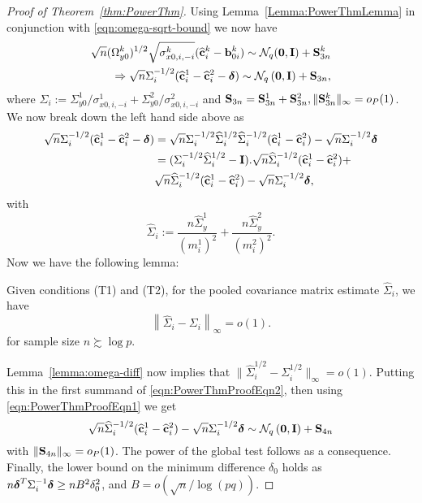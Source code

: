 \begin{proof}[Proof of Theorem~\ref{thm:PowerThm}]
Using Lemma~\ref{Lemma:PowerThmLemma} in conjunction with \eqref{eqn:omega-sqrt-bound} we now have
%
\begin{align}
\sqrt n (\Omega_{y0}^k)^{1/2} \sqrt{\sigma_{x0,i,-i}^k} (\widehat {{\bf{c}}}_i^k - {\bf{b}}_{0i}^k)  \sim
{\cal{N}}_q ( {\bf 0}, {\mathbf{I}}) + {\mathbf{S}}_{3n}^k \notag\\
\Rightarrow \sqrt n \Sigma_i^{-1/2} (\widehat {{\bf{c}}}_i^1 - \widehat {{\bf{c}}}_i^2 - {\boldsymbol{\delta}}) \sim
{\cal{N}}_q \left( {\bf 0}, {\mathbf{I}} \right) + {\mathbf{S}}_{3n},
\label{eqn:PowerThmProofEqn1}
\end{align}
%
where $\Sigma_i := \Sigma_{y0}^1/ \sigma_{x0,i,-i}^1 + \Sigma_{y0}^2/ \sigma_{x0,i,-i}^2$ and ${\mathbf{S}}_{3n} = {\mathbf{S}}_{3n}^1 + {\mathbf{S}}_{3n}^2, \|{\mathbf{S}}_{3n}^k\|_\infty = o_P(1)$. We now break down the left hand side above as
%
\begin{align}
\sqrt n \Sigma_i^{-1/2} (\widehat {{\bf{c}}}_i^1 - \widehat {{\bf{c}}}_i^2 - {\boldsymbol{\delta}}) &=
\sqrt n \Sigma_i^{-1/2} \widehat \Sigma_i^{1/2} \widehat \Sigma_i^{-1/2} (\widehat {{\bf{c}}}_i^1 - \widehat {{\bf{c}}}_i^2) - \sqrt n \Sigma_i^{-1/2} {\boldsymbol{\delta}} \notag\\
&= (\Sigma_i^{-1/2} \widehat \Sigma_i^{1/2} - {\mathbf{I}}) . \sqrt n \widehat \Sigma_i^{-1/2} (\widehat {{\bf{c}}}_i^1 - \widehat {{\bf{c}}}_i^2) + \notag\\
& \sqrt n \widehat \Sigma_i^{-1/2} (\widehat {{\bf{c}}}_i^1 - \widehat {{\bf{c}}}_i^2) - \sqrt n \Sigma_i^{-1/2} {\boldsymbol{\delta}},
\label{eqn:PowerThmProofEqn2}
\end{align}
%
with
%
$$
\widehat \Sigma_i :=
\frac{ n \widehat \Sigma_y^1}{(m_i^1)^2} + \frac{n \widehat \Sigma_y^2}{(m_i^2)^2}.
$$
%
Now we have the following lemma:
%
\begin{Lemma}\label{Lemma:PowerThmLemma2}
Given conditions (T1) and (T2), for the pooled covariance matrix estimate $\widehat \Sigma_i$, we have
%
$$
\left\| \widehat \Sigma_i - \Sigma_i \right\|_\infty = o(1).
$$
%
for sample size $n \succsim \log p$.
\end{Lemma}
%
Lemma~\ref{lemma:omega-diff} now implies that $\| \widehat \Sigma_i^{1/2} - \Sigma_i^{1/2} \|_\infty = o(1)$. Putting this in the first summand of \eqref{eqn:PowerThmProofEqn2}, then using \eqref{eqn:PowerThmProofEqn1} we get
%
$$
\sqrt n \widehat \Sigma_i^{-1/2} (\widehat {{\bf{c}}}_i^1 - \widehat {{\bf{c}}}_i^2) - \sqrt n \Sigma_i^{-1/2} {\boldsymbol{\delta}}
\sim {\cal{N}}_q \left( {\bf 0}, {\mathbf{I}} \right) + {\mathbf{S}}_{4n}
$$
%
with $\| {\mathbf{S}}_{4n} \|_\infty = o_P(1)$. The power of the global test follows as a consequence. Finally, the lower bound on the minimum difference $\delta_0$ holds as $n {\boldsymbol{\delta}}^T \Sigma_i^{-1} {\boldsymbol{\delta}} \geq n B^2 \delta_0^2$, and $B = o(\sqrt n/ \log (pq))$.
\end{proof}

